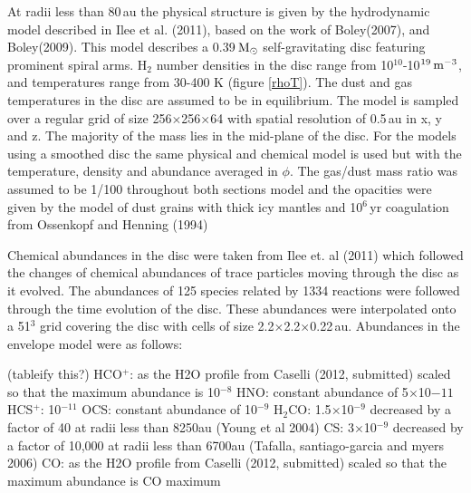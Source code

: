 \documentclass[useAMS,usenatbib]{mn2e}
\begin{document}
At radii less than 80$\,$au the physical structure is given by the hydrodynamic model described in Ilee et al. (2011), based on the work of Boley(2007), and Boley(2009). This model describes a 0.39$\,\rm{M}_\odot$ self-gravitating disc featuring prominent spiral arms. H$_2$ number densities in the disc range from 10$^{10}$-10$^{19}\,\rm{m}^{-3}$, and temperatures range from 30-400 K (figure \ref{rhoT}). The dust and gas temperatures in the disc are assumed to be in equilibrium. The model is sampled over a regular grid of size 256$\times$256$\times$64 with spatial resolution of 0.5$\,$au in x, y and z. The majority of the mass lies in the mid-plane of the disc. For the models using a smoothed disc the same physical and chemical model is used but with the temperature, density and abundance averaged in $\phi$. The gas/dust mass ratio was assumed to be 1/100 throughout both sections model and the opacities were given by the model of dust grains with thick icy mantles and 10$^6\,$yr coagulation from Ossenkopf and Henning (1994)\newline

Chemical abundances in the disc were taken from Ilee et. al (2011) which followed the changes of chemical abundances of trace particles moving through the disc as it evolved. The abundances of 125 species related by 1334 reactions were followed through the time evolution of the disc. These abundances were interpolated onto a 51$^3$ grid covering the disc with cells of size 2.2$\times$2.2$\times$0.22$\,$au. Abundances in the envelope model were as follows:\newline

(tableify this?)\newline
HCO$^+$: as the H2O profile from Caselli (2012, submitted) scaled so that the maximum abundance is 10$^{-8}$\newline
HNO: constant abundance of 5$\times$10${-11}$\newline
HCS$^+$: 10$^{-11}$\newline
OCS: constant abundance of 10$^{-9}$\newline
H$_2$CO: 1.5$\times$10$^{-9}$ decreased by a factor of 40 at radii less than 8250au (Young et al 2004)\newline
CS:  3$\times$10$^{-9}$ decreased by a factor of 10,000 at radii less than 6700au (Tafalla, santiago-garcia and myers 2006)\newline
CO: as the H2O profile from Caselli (2012, submitted) scaled so that the maximum abundance is CO maximum\newline
\end{document}
